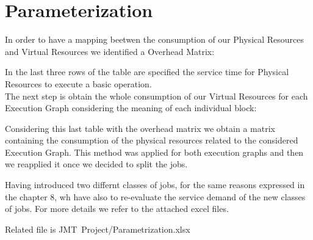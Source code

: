 \chapter{\textbf{Parameterization}}

In order to have a mapping beetwen the consumption of our Physical Resources and Virtual Resources we identified a Overhead Matrix:

\begin{center}
\end{center}
\bigskip

In the last three rows of the table are specified the service time for Physical Resources to execute a basic operation.\\
The next step is obtain the whole consumption of our Virtual Resources for each Execution Graph considering the meaning of each individual block:

\begin{center}
\end{center}


\begin{center}
\end{center}
\bigskip

Considering this last table with the overhead matrix we obtain a matrix containing the consumption of the physical resources related to the considered Execution Graph. This method was applied for both execution graphs and then we reapplied it once we decided to split the jobs.

\begin{center}
\end{center}

Having introduced two differnt classes of jobs, for the same reasons expressed in the chapter 8, wh have also to re-evaluate the service demand of the new classes of jobs. 
For more details we refer to the attached excel files.

Related file is JMT\ Project/Parametrization.xlsx